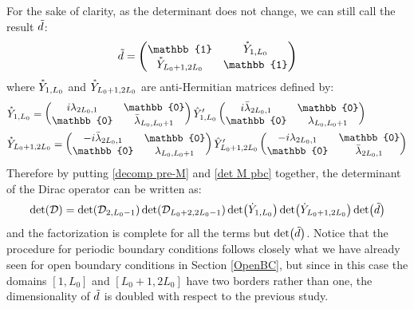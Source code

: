 For the sake of clarity, as the determinant does not change, we can still call the result $\Tilde{d}$:
\begin{equation}\label{tilde d}
    \Tilde{d} = \begin{pmatrix}
        \mathbb{1} & \accentset{\ast}{Y}_{1, L_0} \\
        \accentset{\ast}{Y}_{L_0 + 1, 2L_0} & \mathbb{1} \\
    \end{pmatrix}
\end{equation}
where $\accentset{\ast}{Y}_{1, L_0}$ and $\accentset{\ast}{Y}_{L_0 + 1, 2L_0}$ are anti-Hermitian matrices defined by:
\begin{equation}
    \begin{split}
        & \accentset{\ast}{Y}_{1, L_0} = \begin{pmatrix}
            i\lambda_{2L_0, 1} & \mathbb{0} \\
            \mathbb{0} & \bar{\lambda}_{L_0, L_0 + 1}
        \end{pmatrix} \hat{Y}'_{1, L_0} \begin{pmatrix}
            i\Bar{\lambda}_{2L_0, 1} & \mathbb{0} \\
            \mathbb{0} & \lambda_{L_0, L_0 + 1}
        \end{pmatrix} \\
        & \accentset{\ast}{Y}_{L_0 + 1, 2L_0} = \begin{pmatrix}
            -i\Bar{\lambda}_{2L_0, 1} & \mathbb{0} \\
            \mathbb{0} & \lambda_{L_0, L_0 + 1}
        \end{pmatrix} \hat{Y}'_{L_0 + 1, 2L_0} \begin{pmatrix}
            -i\lambda_{2L_0, 1} & \mathbb{0} \\
            \mathbb{0} & \bar{\lambda}_{2L_0, 1}
        \end{pmatrix}
    \end{split}
\end{equation}
Therefore by putting \eqref{decomp pre-M} and \eqref{det M pbc} together, the determinant of the Dirac operator can be written as:
\begin{equation}\label{det D pbc}
    \det(\mathcal{D}) = \det(\mathcal{D}_{2, L_0 - 1}) \det(\mathcal{D}_{L_0 + 2, 2L_0 - 1}) \det(\Dot{Y}_{1, L_0}) \det(\Dot{Y}_{L_0 + 1, 2L_0}) \det(\Tilde{d})
\end{equation}
and the factorization is complete for all the terms but $\det(\Tilde{d})$. Notice that the procedure for periodic boundary conditions follows closely what we have already seen for open boundary conditions in Section \ref{OpenBC}, but since in this case the domains $[1, L_0]$ and $[L_0 + 1, 2L_0]$ have two borders rather than one, the dimensionality of $\Tilde{d}$ is doubled with respect to the previous study.
